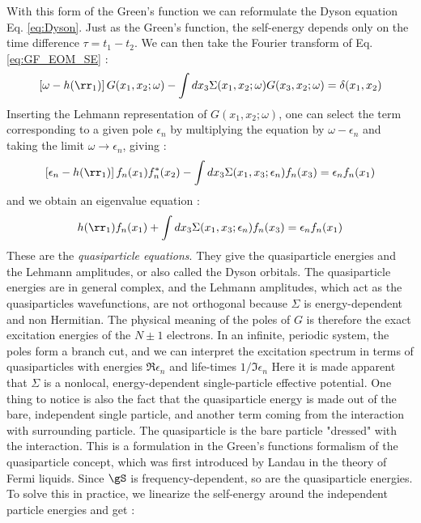 With this form of the Green's function we can reformulate the Dyson equation Eq. \eqref{eq:Dyson}. Just as the Green's function, the self-energy depends only on the time difference $\tau = t_1 - t_2$. We can then take the Fourier transform of Eq. \eqref{eq:GF_EOM_SE} :
\begin{equation}
	\left[ \omega - h(\rr_1) \right] G(x_1,x_2;\omega) - \int dx_3 \Sigma(x_1,x_2;\omega) G(x_3,x_2;\omega) = \delta(x_1,x_2)
\end{equation}
Inserting the Lehmann representation of $G(x_1,x_2;\omega)$, one can select the term corresponding to a given pole $\epsilon_n$ by multiplying the equation by $\omega - \epsilon_n$ and taking the limit $\omega \to \epsilon_n$, giving :
\begin{equation}
	\left[ \epsilon_n - h(\rr_1) \right] f_n(x_1)f^*_n(x_2) - \int dx_3 \Sigma(x_1,x_3;\epsilon_n) f_n(x_3) = \epsilon_n f_n(x_1)
\end{equation}
and we obtain an eigenvalue equation :
\begin{equation}
	h(\rr_1)f_n(x_1) + \int dx_3 \Sigma(x_1,x_3;\epsilon_n)f_n(x_3) = \epsilon_n f_n(x_1)
\end{equation}
These are the \textit{quasiparticle equations}. They give the quasiparticle energies and the Lehmann amplitudes, or also called the Dyson orbitals. The quasiparticle energies are in general complex, and the Lehmann amplitudes, which act as the quasiparticles wavefunctions, are not orthogonal because $\Sigma$ is energy-dependent and non Hermitian. The physical meaning of the poles of $G$ is therefore the exact excitation energies of the $N\pm1$ electrons. In an infinite, periodic system, the poles form a branch cut, and we can interpret the excitation spectrum in terms of quasiparticles with energies $\Re\epsilon_n$ and life-times $1/\Im\epsilon_n$
Here it is made apparent that $\Sigma$ is a nonlocal, energy-dependent single-particle effective potential. One thing to notice is also the fact that the quasiparticle energy is made out of the bare, independent single particle, and another term coming from the interaction with surrounding particle. The quasiparticle is the bare particle "dressed" with the interaction. This is a formulation in the Green's functions formalism of the quasiparticle concept, which was first introduced by Landau in the theory of Fermi liquids. \cite{landau1957oscillations}
Since $\gS$ is frequency-dependent, so are the quasiparticle energies. To solve this in practice, we linearize the self-energy around the independent particle energies and get :

